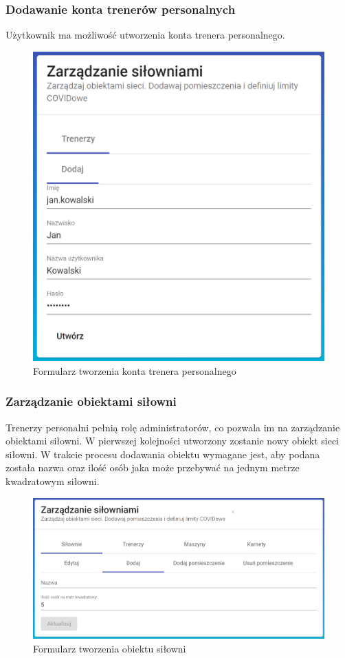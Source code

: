 \documentclass[a4paper,twoside,12pt]{book}
\begin{document}
{\subsubsection{Dodawanie konta trenerów personalnych}
Użytkownik ma możliwość utworzenia konta trenera personalnego.
\begin{figure}[h!]
	\centering
	\includegraphics[width=0.5\linewidth]{../zrzuty_ekranu/dzialanie/trener_personalny/tworzenie_konta_trenera_personalnego}
	\caption{Formularz tworzenia konta trenera personalnego}
	\label{fig:tworzeniekontatrenerapersonalnego}
\end{figure}
\FloatBarrier

\subsubsection{Zarządzanie obiektami siłowni}
Trenerzy personalni pełnią rolę administratorów, co pozwala im na zarządzanie obiektami siłowni.
W pierwszej kolejności utworzony zostanie nowy obiekt sieci siłowni. W trakcie procesu dodawania obiektu wymagane jest, aby podana została nazwa oraz ilość osób jaka może przebywać na jednym metrze kwadratowym siłowni.
\begin{figure}[h!]
	\centering
	\includegraphics[width=0.75\linewidth]{../zrzuty_ekranu/dzialanie/obiekty/tworzenie}
	\caption{Formularz tworzenia obiektu siłowni}
	\label{fig:tworzenie}
\end{figure}
\FloatBarrier

}
\end{document}

